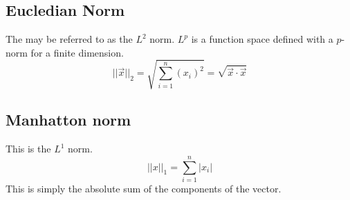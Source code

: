 \documentclass[a4paper]{article}
\newcommand{\norm}[1]{\lvert \lvert#1\rvert \rvert}
\begin{document}
\subsection{Eucledian Norm}
The may be referred to as the $L^2$ norm. $L^p$ is a function space defined with a $p$-norm for a finite dimension.
\begin{equation}
  \norm{\vec{x}}_2 = \sqrt{\sum_{i=1}^n (x_i)^2} = \sqrt{\vec{x}\cdot \vec{x}}
\end{equation}
\subsection{Manhatton norm}
This is the $L^1$ norm.
\begin{equation}
  \norm{x}_1 = \sum_{i=1}^n \rvert x_i \lvert
\end{equation}
This is simply the absolute sum of the components of the vector.
\end{document}
